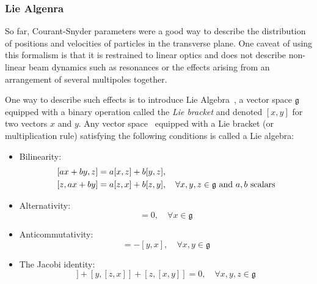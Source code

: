 \subsubsection{Lie Algenra}

So far, Courant-Snyder parameters were a good way to describe the distribution of positions and
velocities of particles in the transverse plane. One caveat of using this formalism is that it is 
restrained to linear optics and does not describe non-linear beam dynamics such as resonances or 
the effects arising from an arrangement of several multipoles together.

One way to describe such effects is to introduce Lie Algebra~\cite{dragt_overview_2013}, a vector
space $\mathfrak{g}$ equipped with a binary operation called the \textit{Lie bracket} and denoted
$[x, y]$ for two vectors $x$ and $y$. Any vector space ~equipped with a Lie bracket (or
multiplication rule) satisfying the following conditions is called a Lie algebra:

\begin{itemize}
    \item Bilinearity:
    \begin{equation}
        \begin{aligned}
        \relax[ax+by, z] &= a[x,z] + b[y,z], \\
        [z, ax+by] &= a[z,x] + b[z,y], \quad \forall x,y,z \in \mathfrak{g}~\text{and}~a,b~\text{scalars}
        \label{eq:coordinates:bilinearity}
        \end{aligned}
    \end{equation}

    \item Alternativity:
    \begin{equation}
        [x,x] = 0, \quad \forall x \in \mathfrak{g}
    \end{equation}

    \item Anticommutativity:
    \begin{equation}
        [x,y] = -[y,x], \quad \forall x,y \in \mathfrak{g}
    \end{equation}

    \item The Jacobi identity:
    \begin{equation}
        [x,[y,z]] + [y, [z,x]] + [z, [x,y]] = 0, \quad \forall x,y,z \in \mathfrak{g}
        \label{eq:coordinates:jacobi_identity}
    \end{equation}
\end{itemize}




